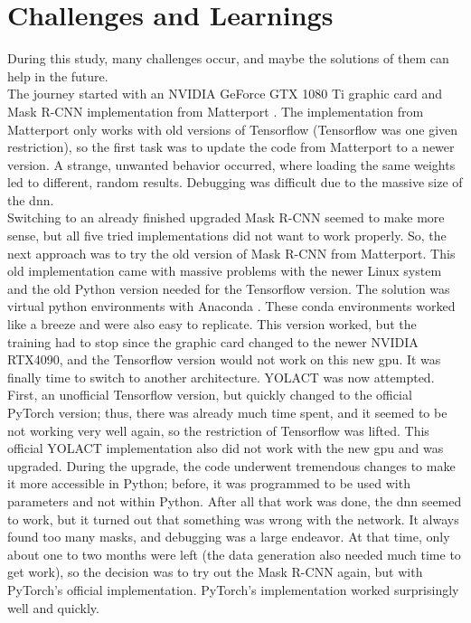 	\section{Challenges and Learnings}    %
	\label{sec:challenges}
		During this study, many challenges occur, and maybe the solutions of them can help in the future.\\
		The journey started with an NVIDIA GeForce GTX 1080 Ti graphic card and Mask R-CNN implementation from Matterport \cite{Matterport}. The implementation from Matterport only works with old versions of Tensorflow (Tensorflow was one given restriction), so the first task was to update the code from Matterport to a newer version. A strange, unwanted behavior occurred, where loading the same weights led to different, random results. Debugging was difficult due to the massive size of the \acl{dnn}. \\
		Switching to an already finished upgraded Mask R-CNN seemed to make more sense, but all five tried implementations did not want to work properly. So, the next approach was to try the old version of Mask R-CNN from Matterport. This old implementation came with massive problems with the newer Linux system and the old Python version needed for the Tensorflow version. The solution was virtual python environments with Anaconda \cite{anaconda}. These conda environments worked like a breeze and were also easy to replicate. This version worked, but the training had to stop since the graphic card changed to the newer NVIDIA RTX4090, and the Tensorflow version would not work on this new \ac{gpu}. It was finally time to switch to another architecture. YOLACT \cite{Bolya2019} was now attempted. First, an unofficial Tensorflow version, but quickly changed to the official PyTorch version; thus, there was already much time spent, and it seemed to be not working very well again, so the restriction of Tensorflow was lifted. This official YOLACT implementation also did not work with the new \ac{gpu} and was upgraded. During the upgrade, the code underwent tremendous changes to make it more accessible in Python; before, it was programmed to be used with parameters and not within Python. After all that work was done, the \ac{dnn} seemed to work, but it turned out that something was wrong with the network. It always found too many masks, and debugging was a large endeavor. At that time, only about one to two months were left (the data generation also needed much time to get work), so the decision was to try out the Mask R-CNN again, but with PyTorch's official implementation. PyTorch's implementation worked surprisingly well and quickly. \\
